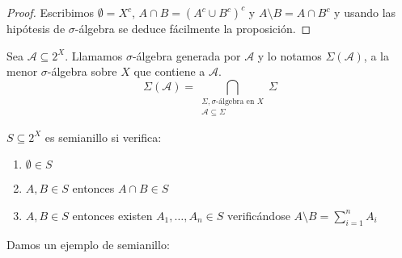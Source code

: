   \begin{proof}
   Escribimos $\emptyset = X^c$, $A\cap B = (A^c \cup B^c)^c$ y $A\setminus B = A\cap B^c$
   y usando las hipótesis de $\sigma$-álgebra se deduce fácilmente la proposición.
  \end{proof}

\begin{definition}
 Sea $\mathcal{A} \subseteq 2^X$. Llamamos $\sigma$-álgebra generada por $\mathcal{A}$ y lo notamos 
 $\Sigma(\mathcal{A})$, a la menor $\sigma$-álgebra sobre $X$ que contiene a $\mathcal{A}$.
 \[
   \Sigma(\mathcal{A}) = 
   \bigcap_{\begin{array}{c}\Sigma, \sigma\textrm{-álgebra en } X\\ \mathcal{A}\subseteq \Sigma \end{array}} \Sigma
 \]
\end{definition}

\begin{definition}[Semianillo en $X$]

 $S\subseteq 2^X$ es semianillo si verifica:
 
 \begin{enumerate}[i]
  \item $\emptyset \in S$
  \item $A,B \in S$ entonces $A\cap B \in S$
  \item $A,B \in S$ entonces existen $A_1, \ldots, A_n \in S$ verificándose $A\setminus B = \sum_{i=1}^n A_i$
 \end{enumerate}
\end{definition}

Damos un ejemplo de semianillo:

